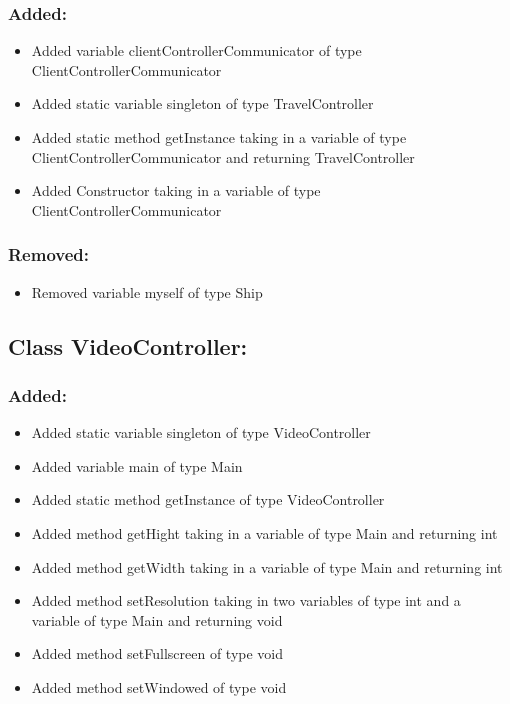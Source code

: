 \documentclass{article}
\begin{document}
\subsubsection{Added:}
\begin{itemize}
\item Added variable clientControllerCommunicator of type ClientControllerCommunicator
\item Added static variable singleton of type TravelController
\item Added static method getInstance taking in a variable of type ClientControllerCommunicator and returning TravelController
\item Added Constructor taking in a variable of type ClientControllerCommunicator
\end{itemize}

\subsubsection{Removed:}
\begin{itemize}
\item Removed variable myself of type Ship
\end{itemize}


\subsection{Class VideoController:}

\subsubsection{Added:}
\begin{itemize}
\item Added static variable singleton of type VideoController
\item Added variable main of type Main
\item Added static method getInstance of type VideoController
\item Added method getHight taking in a variable of type Main and returning int
\item Added method getWidth taking in a variable of type Main and returning int
\item Added method setResolution taking in two variables of type int and a variable of type Main and returning void
\item Added method setFullscreen of type void
\item Added method setWindowed of type void
\end{itemize}
\end{document}
